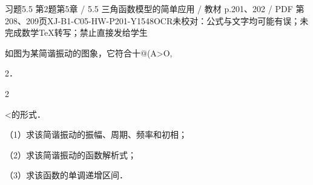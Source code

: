 \begin{bankitem}{习题5.5 第2题}{第5章 / 5.5 三角函数模型的简单应用 / 教材 p.201、202 / PDF 第208、209页}{XJ-B1-C05-HW-P201-Y1548}{OCR未校对：公式与文字均可能有误；未完成数学TeX转写；禁止直接发给学生}
\begin{ocrdraft}
\par
如图为某简谐振动的图象，它符合十@(A>O,
\par
2．
\par
2
\par
[教材p.202 / PDF第209页]
\par
<的形式．
\par
（1）求该简谐振动的振幅、周期、频率和初相；
\par
（2）求该简谐振动的函数解析式；
\par
（3）求该函数的单调递增区间．
\end{ocrdraft}
\end{bankitem}
